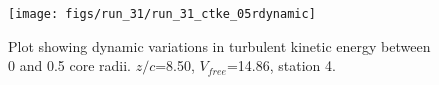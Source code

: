 \begin{figure}[H]
\centering
\texttt{[image: figs/run\_31/run\_31\_ctke\_05rdynamic]}
\caption{Plot showing dynamic variations in turbulent kinetic energy between 0 and 0.5 core radii. $z/c$=8.50, $V_{free}$=14.86, station 4.}
\label{fig:run_31_ctke_05rdynamic}
\end{figure}


